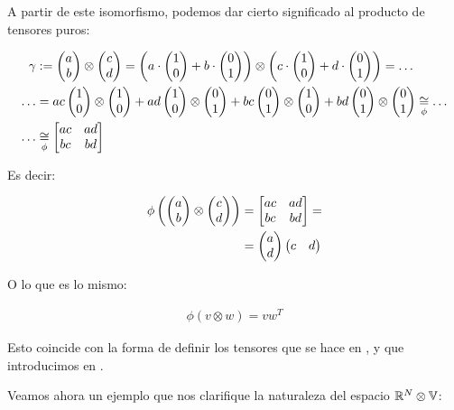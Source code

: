 \begin{ejemplo}
    A partir de este isomorfismo, podemos dar cierto significado al producto de tensores puros:

    \begin{equation}
    \begin{split}
        \gamma &:= \begin{pmatrix} a \\ b \end{pmatrix} \otimes \begin{pmatrix} c \\ d \end{pmatrix} = \left( a \cdot \begin{pmatrix} 1 \\ 0 \end{pmatrix} + b \cdot \begin{pmatrix} 0 \\ 1 \end{pmatrix} \right) \otimes \left( c \cdot \begin{pmatrix} 1 \\ 0 \end{pmatrix} + d \cdot \begin{pmatrix} 0 \\ 1 \end{pmatrix} \right) = \ldots \\
        \ldots &= ac \begin{pmatrix} 1 \\ 0 \end{pmatrix} \otimes \begin{pmatrix} 1 \\ 0 \end{pmatrix} + ad \begin{pmatrix} 1 \\ 0 \end{pmatrix} \otimes \begin{pmatrix} 0 \\ 1 \end{pmatrix} + bc \begin{pmatrix} 0 \\ 1 \end{pmatrix} \otimes \begin{pmatrix} 1 \\ 0 \end{pmatrix} + bd \begin{pmatrix} 0 \\ 1 \end{pmatrix} \otimes \begin{pmatrix} 0 \\ 1 \end{pmatrix} \underset{\phi}{\cong} \ldots \\
        \ldots & \underset{\phi}{\cong} \begin{bmatrix} ac & ad \\ bc & bd \end{bmatrix}
    \end{split}
    \end{equation}

    Es decir:

    \begin{equation}
    \begin{split}
        \phi\left( \begin{pmatrix} a \\ b \end{pmatrix} \otimes \begin{pmatrix} c \\ d \end{pmatrix} \right) & = \begin{bmatrix} ac & ad \\ bc & bd \end{bmatrix} = \\
        & = \begin{pmatrix} a \\ d \end{pmatrix} \begin{pmatrix} c & d \end{pmatrix}
    \end{split}
    \end{equation}

    O lo que es lo mismo:

    \begin{equation}
    \begin{split}
        \phi(v \otimes w) = v w^T
    \end{split}
    \end{equation}

    Esto coincide con la forma de definir los tensores que se hace en \cite{matematicas:principal}, y que introducimos en .
\end{ejemplo}

Veamos ahora un ejemplo que nos clarifique la naturaleza del espacio $\mathbb{R}^N \otimes \mathbb{V}$:


